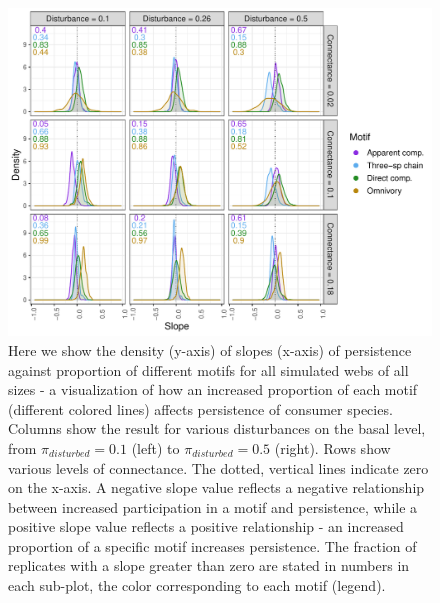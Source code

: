 \documentclass[12pt]{article}
\begin{document}
\begin{spacing}{2.0}
    \begin{figure}[hb!]
    \centering
        \includegraphics[width=\textwidth]{figures/prop_dens_bp_vs_C_allS.pdf}
        \caption{Here we show the density (y-axis) of slopes (x-axis) of persistence against proportion of different motifs for all simulated webs of all sizes - a visualization of how an increased proportion of each motif (different colored lines) affects persistence of consumer species. Columns show the result for various disturbances on the basal level, from $\pi_{disturbed} = 0.1$ (left) to $\pi_{disturbed} = 0.5$ (right). Rows show various levels of connectance. The dotted, vertical lines indicate zero on the x-axis. A negative slope value reflects a negative relationship between increased participation in a motif and persistence, while a positive slope value reflects a positive relationship - an increased proportion of a specific motif increases persistence. The fraction of replicates with a slope greater than zero are stated in numbers in each sub-plot, the color corresponding to each motif (legend). }
        \label{fig:density_prop_C}
    \end{figure}    
    

\end{spacing}
\end{document}
